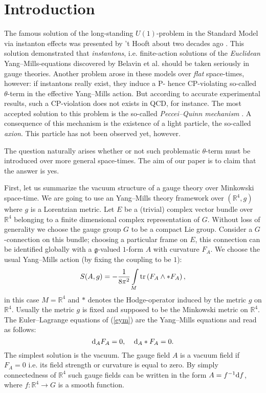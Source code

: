 \documentclass[a4paper,12pt,draft]{article}
\newcommand{\R}{{\mathbb R}}
\newcommand{\g}{{\mathfrak g}}
\newcommand{\dd}{{\rm d}}
\newcommand{\tr}{{\rm tr}}
\begin{document}
\section{Introduction}
The famous solution of the long-standing $U(1)$-problem in the Standard 
Model via instanton effects was presented by 't Hooft about two
decades ago \cite{tho}. This solution demonstrated that {\it instantons},
i.e. finite-action solutions of the {\it Euclidean} Yang--Mills-equations
discovered by Belavin et al. \cite{bpst} should be taken seriously
in gauge theories. Another problem arose in these models over 
{\it flat} space-times, however: if instantons really exist, they induce a
P- hence CP-violating so-called $\theta$-term in the effective Yang--Mills
action. But according to accurate experimental results, such a
CP-violation does not exists in QCD, for instance. The most accepted
solution to this  problem is the so-called {\it Peccei--Quinn mechanism}
\cite{pec}. A consequence of this mechanism is the existence of a light
particle, the so-called {\it axion}. This particle has not been observed
yet, however.

The question naturally arises whether or not such problematic
$\theta$-term must be introduced over more general space-times. The aim of
our paper is to claim that the answer is yes.
 
First, let us summarize the vacuum structure of a gauge theory over 
Minkowski space-time. We are going to use an Yang--Mills theory
framework over $(\R^4 , g)$ where $g$ is a Lorentzian metric. Let
$E$ be a (trivial) complex vector bundle over $\R^4$ belonging to a finite
dimensional complex representation of $G$. Without loss of generality we
choose the gauge group $G$ to be a compact Lie group. Consider a
$G$-connection on this bundle; choosing a particular frame on $E$, this
connection can be identified globally with a $\g$-valued $1$-form $A$
with curvature $F_A$. We choose the usual Yang--Mills action (by
fixing the coupling to be $1$): 
\begin{equation}
S(A,g)=-{1\over 8\pi^2}\int\limits_M\tr\left(F_A\wedge
*F_A\right) ,
\label{eym}
\end{equation}
in this case $M=\R^4$ and $*$ denotes the Hodge-operator
induced by the metric $g$ on $\R^4$. Usually the metric $g$ is fixed and
supposed to be the Minkowski metric on $\R^4$. The 
Euler--Lagrange equations of (\ref{eym}) are the Yang--Mills equations
and read as follows: 
\[\dd_AF_A=0,\:\:\:\:\:\dd_A*F_A=0.\]
The simplest solution is the vacuum. The gauge field $A$ is a vacuum field
if $F_A=0$ i.e. 
its field strength or curvature is equal to zero. By simply connectedness
of $\R^4$ such gauge fields can be written in the form 
$A=f^{-1}\dd f$, where $f: \R^4\rightarrow G$ is a smooth function.
\end{document}
